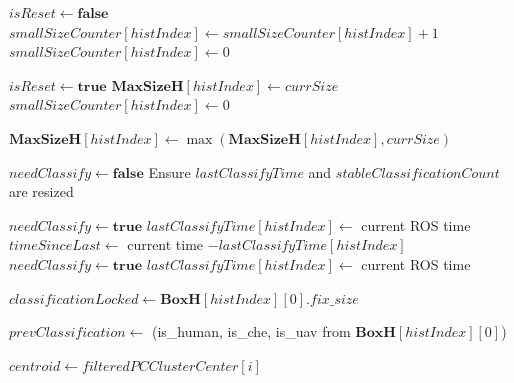 \documentclass[14pt,a4paper]{article}
\begin{document}
\begin{algorithm}
\begin{algorithmic}[1]
            \State $isReset \gets \textbf{false}$
                \State $smallSizeCounter[histIndex] \gets smallSizeCounter[histIndex] + 1$
            \Else
                \State $smallSizeCounter[histIndex] \gets 0$
            \EndIf
            
                \State $isReset \gets \textbf{true}$
                \State $\mathbf{MaxSizeH}[histIndex] \gets currSize$
                \State $smallSizeCounter[histIndex] \gets 0$
            \EndIf
            
                \State $\mathbf{MaxSizeH}[histIndex] \gets \max(\mathbf{MaxSizeH}[histIndex], currSize)$
            \EndIf
            
            \State $needClassify \gets \textbf{false}$
            \State Ensure $lastClassifyTime$ and $stableClassificationCount$ are resized
            
                \State $needClassify \gets \textbf{true}$
                \State $lastClassifyTime[histIndex] \gets$ current ROS time
                \State $timeSinceLast \gets$ current time $- lastClassifyTime[histIndex]$
                    \State $needClassify \gets \textbf{true}$
                    \State $lastClassifyTime[histIndex] \gets$ current ROS time
                \EndIf
            \EndIf
            
            \State $classificationLocked \gets \mathbf{BoxH}[histIndex][0].fix\_size$
            
                \State $prevClassification \gets$ (is\_human, is\_che, is\_uav from $\mathbf{BoxH}[histIndex][0]$)
                
                \State $centroid \gets filteredPCClusterCenter[i]$
                \State {}
                

\end{algorithmic}
\end{algorithm}
\end{document}
